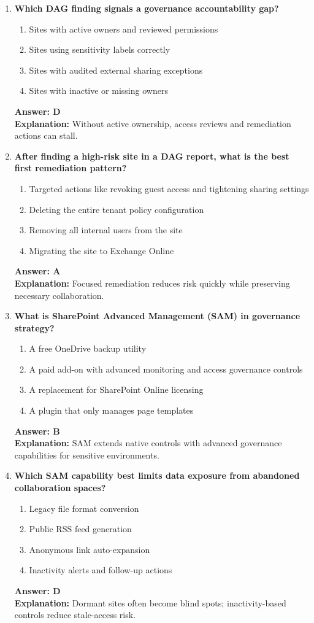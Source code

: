 \documentclass[10pt]{article}
\begin{document}
\begin{enumerate}[leftmargin=*]
\item \textbf{Which DAG finding signals a governance accountability gap?}
\begin{enumerate}[label=\Alph*.]
  \item Sites with active owners and reviewed permissions
  \item Sites using sensitivity labels correctly
  \item Sites with audited external sharing exceptions
  \item Sites with inactive or missing owners
\end{enumerate}
\textbf{Answer: D}\\
\textbf{Explanation:} Without active ownership, access reviews and remediation actions can stall.

\item \textbf{After finding a high-risk site in a DAG report, what is the best first remediation pattern?}
\begin{enumerate}[label=\Alph*.]
  \item Targeted actions like revoking guest access and tightening sharing settings
  \item Deleting the entire tenant policy configuration
  \item Removing all internal users from the site
  \item Migrating the site to Exchange Online
\end{enumerate}
\textbf{Answer: A}\\
\textbf{Explanation:} Focused remediation reduces risk quickly while preserving necessary collaboration.

\item \textbf{What is SharePoint Advanced Management (SAM) in governance strategy?}
\begin{enumerate}[label=\Alph*.]
  \item A free OneDrive backup utility
  \item A paid add-on with advanced monitoring and access governance controls
  \item A replacement for SharePoint Online licensing
  \item A plugin that only manages page templates
\end{enumerate}
\textbf{Answer: B}\\
\textbf{Explanation:} SAM extends native controls with advanced governance capabilities for sensitive environments.

\item \textbf{Which SAM capability best limits data exposure from abandoned collaboration spaces?}
\begin{enumerate}[label=\Alph*.]
  \item Legacy file format conversion
  \item Public RSS feed generation
  \item Anonymous link auto-expansion
  \item Inactivity alerts and follow-up actions
\end{enumerate}
\textbf{Answer: D}\\
\textbf{Explanation:} Dormant sites often become blind spots; inactivity-based controls reduce stale-access risk.


\end{enumerate}
\end{document}
